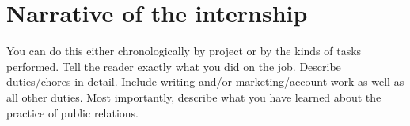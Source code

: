 \chapter{Narrative of the internship}
You can do this either chronologically by project or by the kinds of tasks performed. Tell the reader exactly what you did on the job. Describe duties/chores in detail. Include writing and/or marketing/account work as well as all other duties. Most importantly, describe what you have learned about the practice of public relations.
